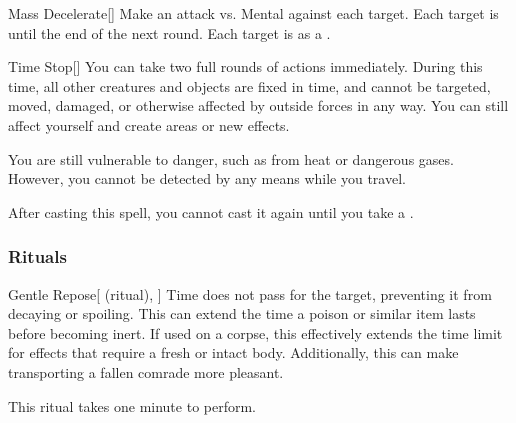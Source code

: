 \lowercase{\hypertarget{spell:Mass Decelerate}{}}\label{spell:Mass Decelerate}
\begin{freeability}[Rank 7]{\hypertarget{spell:Mass Decelerate}{Mass Decelerate}}[]
Make an attack vs. Mental against each target.
\hit Each target is  until the end of the next round.
\crit Each target is  as a .
\end{freeability}
\vspace{0.25em}



\lowercase{\hypertarget{spell:Time Stop}{}}\label{spell:Time Stop}
\begin{freeability}[Rank 8]{\hypertarget{spell:Time Stop}{Time Stop}}[]
You can take two full rounds of actions immediately.
During this time, all other creatures and objects are fixed in time, and cannot be targeted, moved, damaged, or otherwise affected by outside forces in any way.
You can still affect yourself and create areas or new effects.

You are still vulnerable to danger, such as from heat or dangerous gases.
However, you cannot be detected by any means while you travel.

After casting this spell, you cannot cast it again until you take a .
\end{freeability}
\vspace{0.25em}



\subsubsection{Rituals}


\lowercase{\hypertarget{spell:Gentle Repose}{}}\label{spell:Gentle Repose}
\begin{attuneability}[Rank 3]{\hypertarget{spell:Gentle Repose}{Gentle Repose}}[ (ritual), ]
Time does not pass for the target, preventing it from decaying or spoiling.
This can extend the time a poison or similar item lasts before becoming inert.
If used on a corpse, this effectively extends the time limit for effects that require a fresh or intact body.
Additionally, this can make transporting a fallen comrade more pleasant.


This ritual takes one minute to perform.
\end{attuneability}
\vspace{0.25em}


